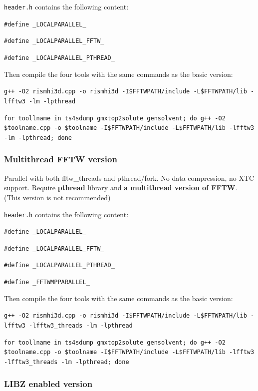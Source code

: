 \documentclass[aip,amsmath,amssymb,reprint,onecolumn]{revtex4-1}
\begin{document}
\texttt{header.h} contains the following content:

\texttt{\small\color{navyblue}\#define \_LOCALPARALLEL\_}

\texttt{\small\color{navyblue}\#define \_LOCALPARALLEL\_FFTW\_}

\texttt{\small\color{navyblue}\#define \_LOCALPARALLEL\_PTHREAD\_}

Then compile the four tools with the same commands as the basic version:

\texttt{\small\color{blue}g++ -O2 rismhi3d.cpp -o rismhi3d -I\$FFTWPATH/include -L\$FFTWPATH/lib -lfftw3 -lm -lpthread}

\texttt{\small\color{blue}for toollname in ts4sdump gmxtop2solute gensolvent; do g++ -O2 \$toolname.cpp -o \$toolname -I\$FFTWPATH/include -L\$FFTWPATH/lib -lfftw3 -lm -lpthread; done}

\subsubsection{Multithread FFTW version}

Parallel with both fftw\_threads and pthread/fork. No data compression, no XTC support. Require {\bf pthread} library and {\bf a multithread version of FFTW}. (This version is not recommended)

\texttt{header.h} contains the following content:

\texttt{\small\color{navyblue}\#define \_LOCALPARALLEL\_}

\texttt{\small\color{navyblue}\#define \_LOCALPARALLEL\_FFTW\_}

\texttt{\small\color{navyblue}\#define \_LOCALPARALLEL\_PTHREAD\_}

\texttt{\small\color{navyblue}\#define \_FFTWMPPARALLEL\_}

Then compile the four tools with the same commands as the basic version:

\texttt{\small\color{blue}g++ -O2 rismhi3d.cpp -o rismhi3d -I\$FFTWPATH/include -L\$FFTWPATH/lib -lfftw3 -lfftw3\_threads -lm -lpthread}

\texttt{\small\color{blue}for toollname in ts4sdump gmxtop2solute gensolvent; do g++ -O2 \$toolname.cpp -o \$toolname -I\$FFTWPATH/include -L\$FFTWPATH/lib -lfftw3 -lfftw3\_threads -lm -lpthread; done}

\subsubsection{LIBZ enabled version}
\end{document}
